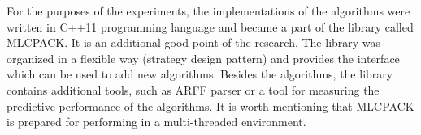 For the purposes of the experiments, the implementations of the algorithms were written in C++11 programming language and became a part of the library called MLCPACK. It is an additional good point of the research. The library was organized in a flexible way (strategy design pattern) and provides the interface which can be used to add new algorithms. Besides the algorithms, the library contains additional tools, such as ARFF parser or a tool for measuring the predictive performance of the algorithms. It is worth mentioning that MLCPACK is prepared for performing in a multi-threaded environment.
